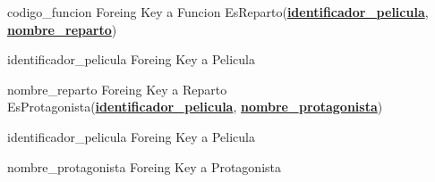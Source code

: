 \documentclass[15pt]{article}
\begin{document}
\hspace{1cm} codigo\_funcion	Foreing Key a Funcion
\newline
EsReparto(\underline{\textbf{identificador\_pelicula}}, \underline{\textbf{nombre\_reparto}})

\hspace{1cm} identificador\_pelicula	Foreing Key a Pelicula
    
\hspace{1cm} nombre\_reparto	Foreing Key a Reparto
\newline
EsProtagonista(\underline{\textbf{identificador\_pelicula}}, \underline{\textbf{nombre\_protagonista}})

\hspace{1cm} identificador\_pelicula	Foreing Key a Pelicula
    
\hspace{1cm} nombre\_protagonista	Foreing Key a Protagonista
\newline
\newline
\end{document}
